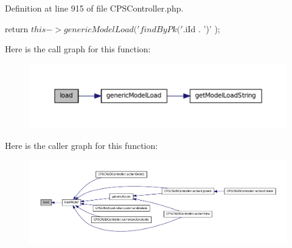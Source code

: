 Definition at line 915 of file CPSController.php.




\begin{DoxyCode}
    {
        return $this->genericModelLoad( 'findByPk(' . $iId . ')' );
    }
\end{DoxyCode}




Here is the call graph for this function:\nopagebreak
\begin{figure}[H]
\begin{center}
\leavevmode
\includegraphics[width=400pt]{classCPSController_affcc785cc14ed277532e5462fcb0463c_cgraph}
\end{center}
\end{figure}




Here is the caller graph for this function:\nopagebreak
\begin{figure}[H]
\begin{center}
\leavevmode
\includegraphics[width=400pt]{classCPSController_affcc785cc14ed277532e5462fcb0463c_icgraph}
\end{center}
\end{figure}


